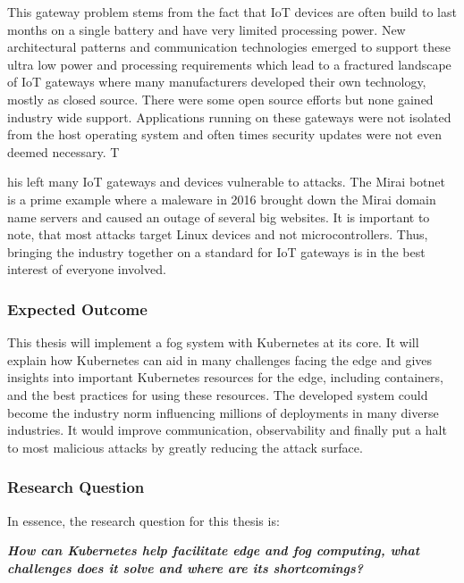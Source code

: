 {This gateway problem stems from the fact that IoT devices are often build to last months on a single battery and have very limited processing power. New architectural patterns and communication technologies emerged to support these ultra low power and processing requirements which lead to a fractured landscape of IoT gateways where many manufacturers developed their own technology, mostly as closed source. There were some open source efforts but none gained industry wide support. Applications running on these gateways were not isolated from the host operating system and often times security updates were not even deemed necessary. T

his left many IoT gateways and devices vulnerable to attacks. The Mirai botnet\cite{7971869MiraiAndOtherBotnetLinux} is a prime example where a maleware in 2016 brought down the Mirai domain name servers and caused an outage of several big websites. It is important to note, that most attacks target Linux devices and not microcontrollers. Thus, bringing the industry together on a standard for IoT gateways is in the best interest of everyone involved. 
}

\subsubsection{Expected Outcome}
This thesis will implement a fog system with Kubernetes at its core. It will explain how Kubernetes can aid in many challenges facing the edge and gives insights into important Kubernetes resources for the edge, including containers, and the best practices for using these resources. The developed system could become the industry norm influencing millions of deployments in many diverse industries. It would improve communication, observability and finally put a halt to most malicious attacks by greatly reducing the attack surface.\\

\subsubsection{Research Question}
In essence, the research question for this thesis is:
\begin{displayquote}\begin{center}
{\textit{\textbf{How can Kubernetes help facilitate edge and fog computing, what challenges does it solve and where are its shortcomings?}}}
\end{center}\end{displayquote}

